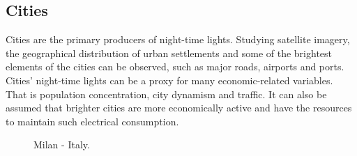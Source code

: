 \subsection{Cities}
Cities are the primary producers of night-time lights. Studying satellite imagery, the geographical distribution of urban settlements and some of the brightest elements of the cities can be observed, such as major roads,  airports and ports.
Cities' night-time lights can be a proxy for many economic-related variables. That is population concentration, city dynamism and traffic. It can also be assumed that brighter cities are more economically active and have the resources to maintain such electrical consumption.
\begin{figure}[h!]
    \hspace*{-2.8cm}
    \centering
    \caption{Milan - Italy.}%
    \label{fig:milan}
\end{figure}

